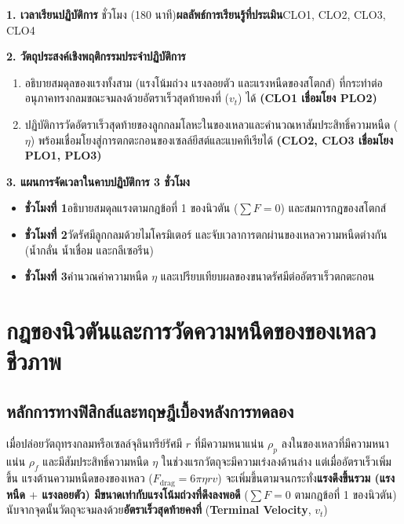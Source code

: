 \cleardoublepage
{}
\begin{planbox}
\noindent\textbf{1. เวลาเรียนปฏิบัติการ} ชั่วโมง (180 นาที)\quad \textbf{ผลลัพธ์การเรียนรู้ที่ประเมิน}\quad CLO1, CLO2, CLO3, CLO4

\noindent\textbf{2. วัตถุประสงค์เชิงพฤติกรรมประจำปฏิบัติการ}
\begin{enumerate}
    \item อธิบายสมดุลของแรงทั้งสาม (แรงโน้มถ่วง แรงลอยตัว และแรงหนืดของสโตกส์) ที่กระทำต่ออนุภาคทรงกลมขณะจมลงด้วยอัตราเร็วสุดท้ายคงที่ ($v_t$) ได้ \textbf{(CLO1 เชื่อมโยง PLO2)}
    \item ปฏิบัติการวัดอัตราเร็วสุดท้ายของลูกกลมโลหะในของเหลวและคำนวณหาสัมประสิทธิ์ความหนืด ($\eta$) พร้อมเชื่อมโยงสู่การตกตะกอนของเซลล์ยีสต์และแบคทีเรียได้ \textbf{(CLO2, CLO3 เชื่อมโยง PLO1, PLO3)}
\end{enumerate}

\noindent\textbf{3. แผนการจัดเวลาในคาบปฏิบัติการ 3 ชั่วโมง}
\begin{itemize}
    \item \textbf{ชั่วโมงที่ 1}\quad อธิบายสมดุลแรงตามกฎข้อที่ 1 ของนิวตัน ($\sum F = 0$) และสมการกฎของสโตกส์
    \item \textbf{ชั่วโมงที่ 2}\quad วัดรัศมีลูกกลมด้วยไมโครมิเตอร์ และจับเวลาการตกผ่านของเหลวความหนืดต่างกัน (น้ำกลั่น น้ำเชื่อม และกลีเซอรีน)
    \item \textbf{ชั่วโมงที่ 3}\quad คำนวณค่าความหนืด $\eta$ และเปรียบเทียบผลของขนาดรัศมีต่ออัตราเร็วตกตะกอน
\end{itemize}
\end{planbox}
\clearpage

\chapter{กฎของนิวตันและการวัดความหนืดของของเหลวชีวภาพ}

\section{หลักการทางฟิสิกส์และทฤษฎีเบื้องหลังการทดลอง}

เมื่อปล่อยวัตถุทรงกลมหรือเซลล์จุลินทรีย์รัศมี $r$ ที่มีความหนาแน่น $\rho_p$ ลงในของเหลวที่มีความหนาแน่น $\rho_f$ และมีสัมประสิทธิ์ความหนืด $\eta$ ในช่วงแรกวัตถุจะมีความเร่งลงด้านล่าง แต่เมื่ออัตราเร็วเพิ่มขึ้น แรงต้านความหนืดของของเหลว ($F_{\text{drag}} = 6\pi\eta r v$) จะเพิ่มขึ้นตามจนกระทั่ง\textbf{แรงดึงขึ้นรวม (แรงหนืด $+$ แรงลอยตัว) มีขนาดเท่ากับแรงโน้มถ่วงที่ดึงลงพอดี} ($\sum F = 0$ ตามกฎข้อที่ 1 ของนิวตัน) นับจากจุดนั้นวัตถุจะจมลงด้วย\textbf{อัตราเร็วสุดท้ายคงที่} (\textbf{Terminal Velocity}, $v_t$)

